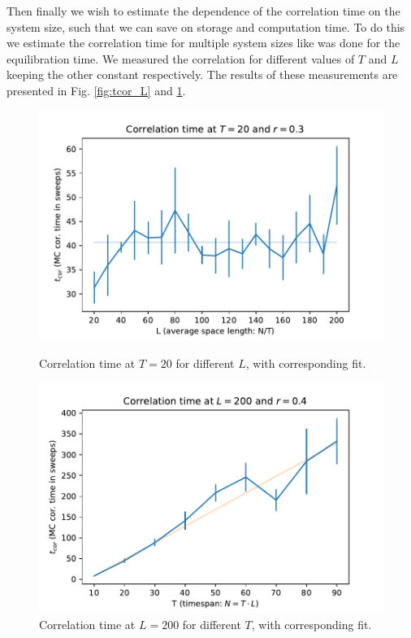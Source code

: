 Then finally we wish to estimate the dependence of the correlation time on the system size, such that we can save on storage and computation time.
To do this we estimate the correlation time for multiple system sizes like was done for the equilibration time. We measured the correlation for different values of $T$ and $L$ keeping the other constant respectively.
The results of these measurements are presented in Fig. \ref{fig:tcor_L} and \ref{fig:tcor_T}.
\begin{figure}
    \centering
    \begin{minipage}{0.48\linewidth}
        \centering
        \includegraphics[width=1.0\linewidth]{img/tcor_l_t20_r0.3.pdf}
        \caption{Correlation time at $T = 20$ for different $L$, with corresponding fit.}
        \label{fig:tcor_L}
    \end{minipage}
    \hfill
    \begin{minipage}{0.48\linewidth}
        \centering
        \includegraphics[width=1.0\linewidth]{img/tcor_t_l200_r0.4.pdf}
        \caption{Correlation time at $L = 200$ for different $T$, with corresponding fit.}
        \label{fig:tcor_T}
    \end{minipage}
\end{figure}
